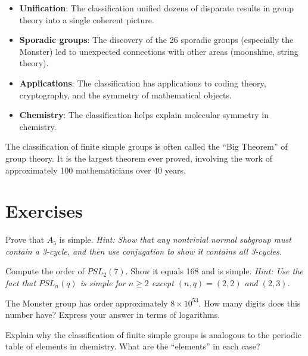 \begin{itemize}
\item \textbf{Unification}: The classification unified dozens of disparate results in group theory into a single coherent picture.
\item \textbf{Sporadic groups}: The discovery of the 26 sporadic groups (especially the Monster) led to unexpected connections with other areas (moonshine, string theory).
\item \textbf{Applications}: The classification has applications to coding theory, cryptography, and the symmetry of mathematical objects.
\item \textbf{Chemistry}: The classification helps explain molecular symmetry in chemistry.
\end{itemize}

\begin{highlightbox}
The classification of finite simple groups is often called the ``Big Theorem'' of group theory. It is the largest theorem ever proved, involving the work of approximately 100 mathematicians over 40 years.
\end{highlightbox}

\section{Exercises}

\begin{exercise}[Basic]
Prove that $A_5$ is simple. \emph{Hint: Show that any nontrivial normal subgroup must contain a 3-cycle, and then use conjugation to show it contains all 3-cycles.}
\end{exercise}

\begin{exercise}[Intermediate]
Compute the order of $PSL_2(7)$. Show it equals 168 and is simple. \emph{Hint: Use the fact that $PSL_n(q)$ is simple for $n \geq 2$ except $(n,q) = (2,2)$ and $(2,3)$.}
\end{exercise}

\begin{exercise}[Challenge]
The Monster group has order approximately $8 \times 10^{53}$. How many digits does this number have? Express your answer in terms of logarithms.
\end{exercise}

\begin{exercise}
Explain why the classification of finite simple groups is analogous to the periodic table of elements in chemistry. What are the ``elements'' in each case?
\end{exercise}


